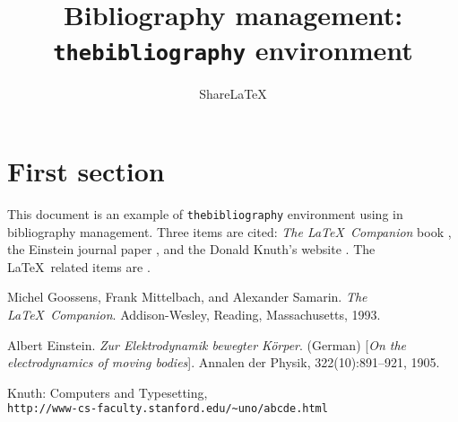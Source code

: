 \documentclass[a4paper,10pt]{article}
\title{Bibliography management:\\\texttt{thebibliography} environment}
\author{Share\LaTeX}
\date{}
\begin{document}
\maketitle

\tableofcontents

\section{First section}

This document is an example of \texttt{thebibliography} environment using in bibliography management. Three items are cited: \textit{The \LaTeX\ Companion} book \cite{latexcompanion}, the Einstein journal paper \cite{einstein}, and the Donald Knuth's website \cite{knuthwebsite}. The \LaTeX\ related items are \cite{latexcompanion,knuthwebsite}. 

\medskip

\begin{thebibliography}{9}
Michel Goossens, Frank Mittelbach, and Alexander Samarin. 
\textit{The \LaTeX\ Companion}. 
Addison-Wesley, Reading, Massachusetts, 1993.

Albert Einstein. 
\textit{Zur Elektrodynamik bewegter K{\"o}rper}. (German) [\textit{On the electrodynamics of moving bodies}]. 
Annalen der Physik, 322(10):891–921, 1905.

Knuth: Computers and Typesetting,
\\\texttt{http://www-cs-faculty.stanford.edu/\~{}uno/abcde.html}
\end{thebibliography}
\end{document}
